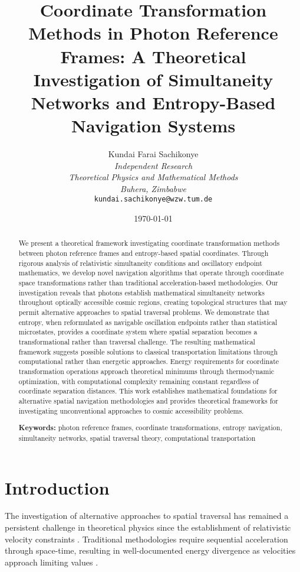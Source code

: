 \documentclass[12pt,a4paper]{article}
\title{\textbf{Coordinate Transformation Methods in Photon Reference Frames: A Theoretical Investigation of Simultaneity Networks and Entropy-Based Navigation Systems}}
\author{
Kundai Farai Sachikonye\\
\textit{Independent Research}\\
\textit{Theoretical Physics and Mathematical Methods}\\
\textit{Buhera, Zimbabwe}\\
\texttt{kundai.sachikonye@wzw.tum.de}
}
\date{\today}
\begin{document}
\maketitle

\begin{abstract}
We present a theoretical framework investigating coordinate transformation methods between photon reference frames and entropy-based spatial coordinates. Through rigorous analysis of relativistic simultaneity conditions and oscillatory endpoint mathematics, we develop novel navigation algorithms that operate through coordinate space transformations rather than traditional acceleration-based methodologies. Our investigation reveals that photons establish mathematical simultaneity networks throughout optically accessible cosmic regions, creating topological structures that may permit alternative approaches to spatial traversal problems. We demonstrate that entropy, when reformulated as navigable oscillation endpoints rather than statistical microstates, provides a coordinate system where spatial separation becomes a transformational rather than traversal challenge. The resulting mathematical framework suggests possible solutions to classical transportation limitations through computational rather than energetic approaches. Energy requirements for coordinate transformation operations approach theoretical minimums through thermodynamic optimization, with computational complexity remaining constant regardless of coordinate separation distances. This work establishes mathematical foundations for alternative spatial navigation methodologies and provides theoretical frameworks for investigating unconventional approaches to cosmic accessibility problems.

\textbf{Keywords:} photon reference frames, coordinate transformations, entropy navigation, simultaneity networks, spatial traversal theory, computational transportation
\end{abstract}

\section{Introduction}

The investigation of alternative approaches to spatial traversal has remained a persistent challenge in theoretical physics since the establishment of relativistic velocity constraints \cite{einstein1905special}. Traditional methodologies require sequential acceleration through space-time, resulting in well-documented energy divergence as velocities approach limiting values \cite{jackson1999classical}.
\end{document}

